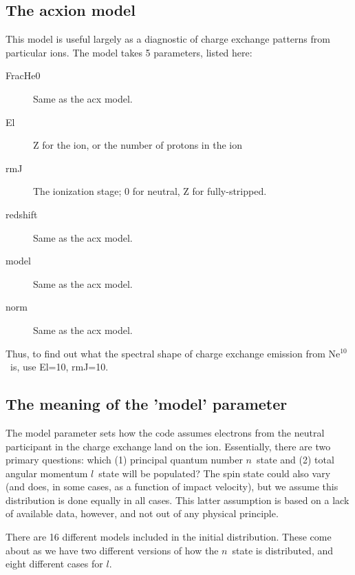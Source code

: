 \documentclass[11pt]{article}
\begin{document}
\subsection*{The acxion model}

This model is useful largely as a diagnostic of charge exchange
patterns from particular ions.  The model takes 5 parameters, listed
here:

\begin{description}
\item[FracHe0]  Same as the acx model.
\item[El] Z for the ion, or the number of protons in the ion
\item[rmJ] The ionization stage; 0 for neutral, Z for fully-stripped.
\item[redshift] Same as the acx model.
\item[model]Same as the acx model.
\item[norm]Same as the acx model.
\end{description}

Thus, to find out what the spectral shape of charge exchange emission
from Ne$^{10}$\ is, use El=10, rmJ=10.

\subsection*{The meaning of the 'model' parameter\label{subsec:model}}

The model parameter sets how the code assumes electrons from the
neutral participant in the charge exchange land on the ion.  
Essentially, there are two primary questions: which (1) principal
quantum number $n$\ state and (2) total angular momentum $l$\ state
will be populated?  The spin state could also vary (and does, in
some cases, as a function of impact velocity), but we assume this
distribution is done equally in all cases.  This latter assumption is
based on a lack of available data, however, and not out of any
physical principle.    

There are 16 different models included in the initial distribution.
These come about as we have two different versions of how the $n$\
state is distributed, and eight different cases for $l$.
\end{document}
